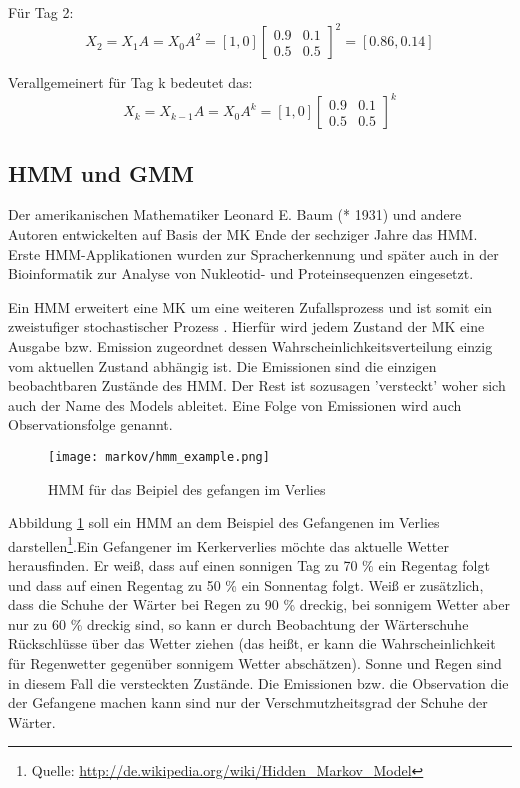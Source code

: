 Für Tag 2:\\
\[ X_2 = X_1 A = X_0 A^2 = [ 1, 0 ] \begin {bmatrix} 0.9&0.1\\0.5&0.5 \end {bmatrix}^2 = [ 0.86, 0.14] \] 

Verallgemeinert für Tag k bedeutet das: 
\[ X_k = X_{k-1} A = X_0 A^k = [ 1, 0 ] \begin {bmatrix} 0.9&0.1\\0.5&0.5 \end {bmatrix}^k \] 


\subsection{\acl{HMM} und \acl{GMM}}  \label{sec:hmm}
Der amerikanischen Mathematiker Leonard E. Baum (* 1931) und andere Autoren entwickelten auf Basis der \acl{MK} Ende der 
sechziger Jahre das \acl{HMM}. Erste \acl{HMM}-Applikationen wurden zur Spracherkennung und später auch in der Bioinformatik 
zur Analyse von Nukleotid- und Proteinsequenzen eingesetzt. 

Ein \acl{HMM} erweitert eine \acl{MK} um eine weiteren Zufallsprozess und ist
somit ein zweistufiger stochastischer Prozess \cite[67]{mmmFink}. Hierfür wird
jedem Zustand der \acl{MK} eine Ausgabe bzw. Emission zugeordnet dessen
Wahrscheinlichkeitsverteilung einzig vom aktuellen Zustand abhängig ist. Die
Emissionen sind die einzigen beobachtbaren Zustände des \acl{HMM}. Der Rest
ist sozusagen 'versteckt' woher sich auch der Name des Models ableitet. Eine
Folge von Emissionen wird auch Observationsfolge genannt.

\begin{figure}[htbp] \centering
    \texttt{[image: markov/hmm\_example.png]}
    \caption{\acl{HMM} für das Beipiel des gefangen im Verlies}
    \label{fig:hmm_example}
\end{figure}

Abbildung \ref{fig:hmm_example} soll ein \acl{HMM} an dem Beispiel des
Gefangenen im Verlies darstellen\footnote{Quelle:
\url{http://de.wikipedia.org/wiki/Hidden_Markov_Model}}.Ein Gefangener im
Kerkerverlies möchte das aktuelle Wetter herausfinden. Er weiß, dass auf einen
sonnigen Tag zu 70 \% ein Regentag folgt und dass auf einen Regentag zu 50 \%
ein Sonnentag folgt. Weiß er zusätzlich, dass die Schuhe der Wärter bei Regen zu
90 \% dreckig, bei sonnigem Wetter aber nur zu 60 \% dreckig sind, so kann er
durch Beobachtung der Wärterschuhe Rückschlüsse über das Wetter ziehen (das
heißt, er kann die Wahrscheinlichkeit für Regenwetter gegenüber sonnigem Wetter
abschätzen). Sonne und Regen sind in diesem Fall die versteckten Zustände. Die
Emissionen bzw. die Observation die der Gefangene machen kann sind nur der
Verschmutzheitsgrad der Schuhe der Wärter.

